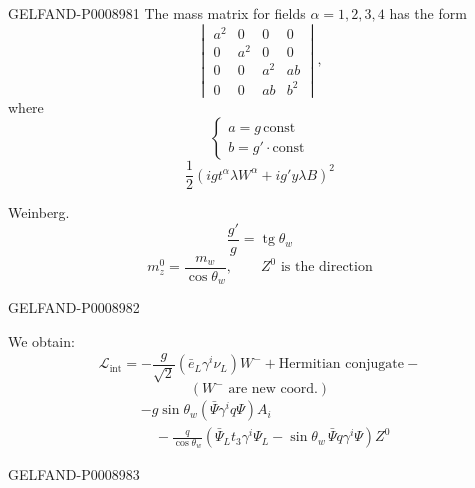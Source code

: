\begin{GelfandAdjacentEvidence}{GELFAND-P000898}{1}
The mass matrix for fields $\alpha=1,2,3,4$ has the form
\begin{equation*}
\begin{vmatrix}
a^2 & 0 & 0 & 0\\
0 & a^2 & 0 & 0\\
0 & 0 & a^2 & ab\\
0 & 0 & ab & b^2
\end{vmatrix},
\tag{33}
\end{equation*}
where
\begin{equation*}
\begin{cases}
a=g\,\mathrm{const}\\
b=g'\cdot\mathrm{const}
\end{cases}
\tag{34}
\end{equation*}
\begin{equation*}
\frac12\left(igt^\alpha\lambda W^\alpha+ig'y\lambda B\right)^2 \tag{35}
\end{equation*}

Weinberg.
\begin{equation*}
\frac{g'}{g}=\operatorname{tg}\theta_w \tag{36}
\end{equation*}
\[
m_z^0=\frac{m_w}{\cos\theta_w},\qquad Z^0\text{ is the direction}
\]
\end{GelfandAdjacentEvidence}
\begin{GelfandAdjacentEvidence}{GELFAND-P000898}{2}


We obtain:
\begin{equation*}
\mathcal L_{\mathrm{int}}
=-\frac{g}{\sqrt2}\left(\bar e_L\gamma^i\nu_L\right)W^-
+\text{Hermitian conjugate}- \tag{37}
\end{equation*}
\[
\left(W^-\text{ are new coord.}\right)
\]
\[
\begin{aligned}
&-g\sin\theta_w\left(\bar\Psi\gamma^i q\Psi\right)A_i\\
&\quad-\frac{q}{\cos\theta_w}
  \left(\bar\Psi_Lt_3\gamma^i\Psi_L-\sin\theta_w\,\bar\Psi q\gamma^i\Psi\right)Z^0
\end{aligned}
\]
\end{GelfandAdjacentEvidence}
\begin{GelfandAdjacentEvidence}{GELFAND-P000898}{3}

\end{GelfandAdjacentEvidence}
